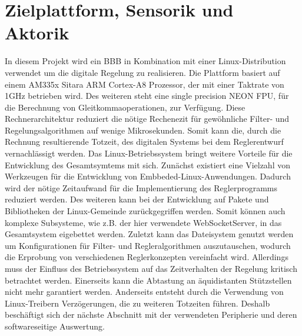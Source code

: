 \section{Zielplattform, Sensorik und Aktorik}
In diesem Projekt wird ein \ac{BBB} in Kombination mit einer Linux-Distribution verwendet um die digitale Regelung zu realisieren. Die Plattform basiert auf einem AM335x Sitara ARM Cortex-A8 Prozessor, der mit einer Taktrate von 1GHz betrieben wird. Des weiteren steht eine single precision NEON FPU, für die Berechnung von Gleitkommaoperationen, zur Verfügung. Diese Rechnerarchitektur reduziert die nötige Rechenezit für gewöhnliche Filter- und Regelungsalgorithmen auf wenige Mikrosekunden. Somit kann die, durch die Rechnung resultierende Totzeit, des digitalen Systems bei dem Reglerentwurf vernachlässigt werden.
Das Linux-Betriebssystem bringt weitere Vorteile für die Entwicklung des Gesamtsymtems mit sich. Zunächst existiert eine Vielzahl von Werkzeugen für die Entwicklung von Embbeded-Linux-Anwendungen. Dadurch wird der nötige Zeitaufwand für die Implementierung des Reglerprogramms reduziert werden. Des weiteren kann bei der Entwicklung auf Pakete und Bibliotheken der Linux-Gemeinde zurückgegriffen werden. Somit können auch komplexe Subsysteme, wie z.B. der hier verwendete WebSocketServer, in das Gesamtsystem eigebettet werden. Zuletzt kann das Dateisystem genutzt werden um Konfigurationen für Filter- und Regleralgorithmen auszutauschen, wodurch die Erprobung von verschiedenen Reglerkonzepten vereinfacht wird. 
Allerdings muss der Einfluss des Betriebssystem auf das Zeitverhalten der Regelung kritisch betrachtet werden. Einerseits kann die Abtastung an äquidistanten Stützstellen nicht mehr garantiert werden. Anderseits entsteht durch die Verwendung von Linux-Treibern Verzögerungen, die zu weiteren Totzeiten führen. Deshalb beschäftigt sich der nächste Abschnitt mit der verwendeten Peripherie und deren softwareseitige Auswertung.

